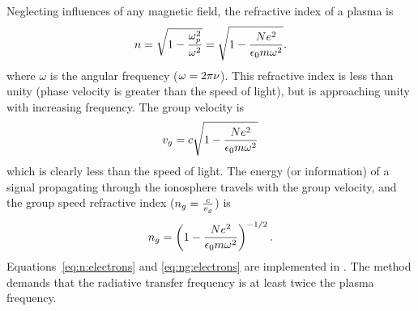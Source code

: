 Neglecting influences of any magnetic field, the refractive index of a plasma
is \citep[e.g.][]{rybicki:radia:79}
\begin{equation}
\label{eq:n:electrons}
n =\sqrt{1-\frac{\omega_{p}^{2}}{\omega^{2}}}=\sqrt{1-\frac{Ne^{2}}
{\epsilon_{0}m\omega^{2}}}.
\end{equation}
where $\omega$ is the angular frequency ($\omega=2\pi\nu$). This refractive
index is less than unity (phase velocity is greater than the speed of light),
but is approaching unity with increasing frequency. The group velocity is
\citep{rybicki:radia:79}
\begin{equation}
v_{g}=c\sqrt{1-\frac{Ne^{2}}
{\epsilon_{0}m\omega^{2}}}
\end{equation}
which is clearly less than the speed of light.
The energy (or information) of a signal propagating through the ionosphere
travels with the group velocity, and the group speed refractive
index (\(n_{g}=\frac{c}{v_{g}}\)) is
\begin{equation}
\label{eq:ng:electrons}
  n_{g}=\left(
    1-\frac{Ne^{2}}
    {\epsilon_{0}m\omega^{2}}
  \right)^{-1/2}.
\end{equation}
Equations~\ref{eq:n:electrons} and \ref{eq:ng:electrons} are implemented in
. The method demands that the
radiative transfer frequency is at least twice the plasma frequency.


